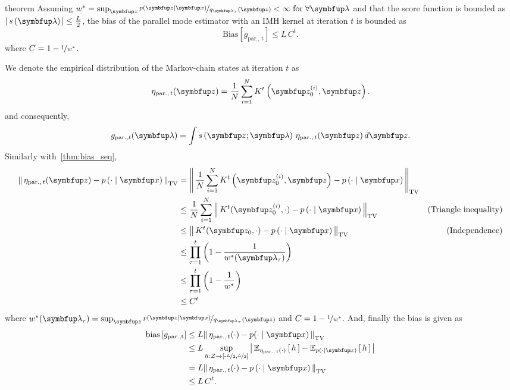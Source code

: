 
\begin{theoremEnd}{theorem}
  Assuming \(w^* = \sup_{\vz} \nicefrac{p\left(\vz\mid\vx\right)}{q_{\vlambda_{\tau}}\left(\vz\right)} < \infty \; \text{for}\;\forall \vlambda \) and that the score function is bounded as \(\left|\, s\left(\vlambda\right) \,\right| \leq \frac{L}{2}\), the bias of the parallel mode estimator with an IMH kernel at iteration \(t\) is bounded as
  {\small
\[
    \mathrm{Bias}\left[ g_{\mathrm{par.,\, t}} \right] \leq L\,C^t.
\]
  }
  where \(C = 1 - \nicefrac{1}{w^*}\).
\end{theoremEnd}
\begin{proofEnd}
  We denote the empirical distribution of the Markov-chain states at iteration \(t\) as
  \begin{align}
    \eta_{\mathrm{par.},\, t}(\vz) = \frac{1}{N} \sum_{i=1}^N K^{t}\left(\vz_0^{(i)}, \vz\right).
  \end{align}
  and consequently,
  \begin{align}
      g_{\mathrm{par.}, t}(\vlambda) = \int s\left(\vz; \vlambda\right) \, \eta_{\mathrm{par.},\, t}(\vz) \, d\vz.
  \end{align}
  Similarly with~\cref{thm:bias_seq}, 
  \begin{align}
    \DTV{ \eta_{\mathrm{par.},\, t}(\vz) }{p\left(\cdot\mid\vx\right)}
    &= \DTV{\frac{1}{N} \sum_{i=1}^N K^{t}\left(\vz_0^{(i)}, \vz\right)}{p\left(\cdot\mid\vx\right)} \\
    &\leq \frac{1}{N} \sum_{i=1}^N  \DTV{K^t(\vz_0^{(i)}, \cdot)}{p\left(\cdot\mid\vx\right)} &\text{(Triangle inequality)} \\
    &\leq \DTV{K^t(\vz_0, \cdot)}{p\left(\cdot\mid\vx\right)} &\text{(Independence)} \\
    &\leq \prod_{\tau=1}^t {\left(1 - \frac{1}{w^*(\vlambda_{\tau})}\right)} \\
    &\leq \prod_{\tau=1}^t {\left(1 - \frac{1}{w^*}\right)} \\
    &\leq C^t
  \end{align}
  where \(w^*(\vlambda_{\tau}) = \sup_{\vz} \nicefrac{p\left(\vz\mid\vx\right)}{q_{\vlambda_{\tau}}\left(\vz\right)} \) and \(C = 1 - \nicefrac{1}{w^*}\).
  And, finally the bias is given as
 \begin{align}
   \mathrm{bias}\left[ g_{\mathrm{par., t}} \right]
   &\leq L \DTV{\eta_{\mathrm{par.},\, t}(\cdot)}{p(\cdot\mid\vx)} \\
   &\leq L \sup_{h : \mathcal{Z} \rightarrow \left[ \text{-}\nicefrac{L}{2}, \nicefrac{L}{2} \right]} \left|\, \Esub{\eta_{\mathrm{par.},\, t}(\cdot)}{h} - \Esub{p(\cdot\mid\vx)}{h} \,\right| \\
   &= L \DTV{ \eta_{\mathrm{par.},\, t}(\cdot) }{p\left(\cdot\mid\vx\right)}  \\
   &\leq L \, C^t.
 \end{align}
\end{proofEnd}

